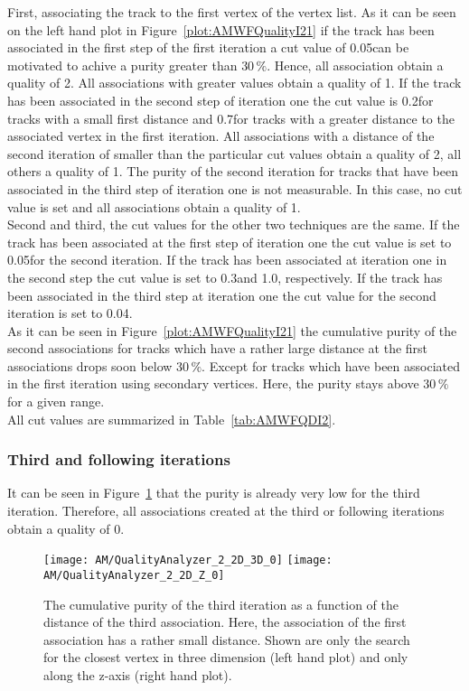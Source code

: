 First, associating the track to the first vertex of the vertex list. As it can be seen on the left hand plot in Figure~\ref{plot:AMWFQualityI21} if the track has been associated in the first step of the first iteration a cut value of 0.05\cm can be motivated to achive a purity greater than $30\,\%$. Hence, all association obtain a quality of 2. All associations with greater values obtain a quality of 1. If the track has been associated in the second step of iteration one the cut value is 0.2\cm for tracks with a small first distance and 0.7\cm for tracks with a greater distance to the associated vertex in the first iteration. All associations with a distance of the second iteration of smaller than the particular cut values obtain a quality of 2, all others a quality of 1. The purity of the second iteration for tracks that have been associated in the third step of iteration one is not measurable. In this case, no cut value is set and all associations obtain a quality of 1.\\ 
Second and third, the cut values for the other two techniques are the same. If the track has been associated at the first step of iteration one the cut value is set to 0.05\cm for the second iteration. If the track has been associated at iteration one in the second step the cut value is set to 0.3\cm and 1.0\cm, respectively. If the track has been associated in the third step at iteration one the cut value for the second iteration is set to 0.04\cm. \\ 
As it can be seen in Figure~\ref{plot:AMWFQualityI21} the cumulative purity of the second associations for tracks which have a rather large distance at the first associations drops soon below $30\,\%$. Except for tracks which have been associated in the first iteration using secondary vertices. Here, the purity stays above $30\,\%$ for a given range. \\
All cut values are summarized in Table~\ref{tab:AMWFQDI2}.



\subsubsection{Third and following iterations}

It can be seen in Figure~\ref{plot:AMWFQualityI30} that the purity is already very low for the third iteration. Therefore, all associations created at the third or following iterations obtain a quality of 0. 

\begin{figure}[!ht]
  \centering
  \texttt{[image: AM/QualityAnalyzer\_2\_2D\_3D\_0]}
  \texttt{[image: AM/QualityAnalyzer\_2\_2D\_Z\_0]}
  \caption[Cumulative purity of iteration three vs relative difference to define quality for smaller distances of association one]{The cumulative purity of the third iteration as a function of the distance of the third association. Here, the association of the first association has a rather small distance. Shown are only the search for the closest vertex in three dimension (left hand plot) and only along the z-axis (right hand plot).\label{plot:AMWFQualityI30}}
\end{figure}

